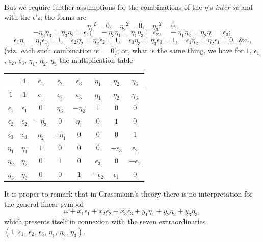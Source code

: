 \documentclass[11pt,a4paper]{book}
\begin{document}
But we require further assumptions for the combinations of the $\eta$'s
\textit{inter se} and with the $\epsilon$'s; the forms are
\[
\eta_1{}^2 = 0, \quad \eta_2{}^2 = 0, \quad \eta_3{}^2 = 0,
\]
\[
- \eta_2 \eta_3 = \eta_3 \eta_2 = \epsilon_1; \quad
- \eta_3 \eta_1 = \eta_1 \eta_3 = \epsilon_2, \quad
- \eta_1 \eta_2 = \eta_2 \eta_1 = \epsilon_3;
\]
\[
\epsilon_1 \eta_1 = \eta_1 \epsilon_1 = 1, \quad
\epsilon_2 \eta_2 = \eta_2 \epsilon_2 = 1, \quad
\epsilon_3 \eta_3 = \eta_3 \epsilon_3 = 1, \quad
\epsilon_1 \eta_2 = \eta_2 \epsilon_1 = 0, \text{ \&c.,}
\]
(viz.\ each such combination is $=0$); or, what is the same thing, we have for
$1$, $\epsilon_1$, $\epsilon_2$, $\epsilon_3$, $\eta_1$, $\eta_2$, $\eta_3$ the multiplication table

\begin{center}
\begin{tabular}{|c|c||c|c|c||c|c|c|}
\hline
  & $1$ & $\epsilon_1$ & $\epsilon_2$ & $\epsilon_3$ & $\eta_1$ & $\eta_2$ & $\eta_3$ \\
\hline
\hline
$1$ & $1$ & $\epsilon_1$ & $\epsilon_2$ & $\epsilon_3$ & $\eta_1$ & $\eta_2$ & $\eta_3$ \\
\hline
$\epsilon_1$ & $\epsilon_1$ & $0$ & $\eta_3$ & $-\eta_2$ & $1$ & $0$ & $0$ \\
$\epsilon_2$ & $\epsilon_2$ & $-\eta_3$ & $0$ & $\eta_1$ & $0$ & $1$ & $0$ \\
$\epsilon_3$ & $\epsilon_3$ & $\eta_2$ & $-\eta_1$ & $0$ & $0$ & $0$ & $1$ \\
\hline
$\eta_1$ & $\eta_1$ & $1$ & $0$ & $0$ & $0$ & $-\epsilon_3$ & $\epsilon_2$ \\
$\eta_2$ & $\eta_2$ & $0$ & $1$ & $0$ & $\epsilon_3$ & $0$ & $-\epsilon_1$ \\
$\eta_3$ & $\eta_3$ & $0$ & $0$ & $1$ & $-\epsilon_2$ & $\epsilon_1$ & $0$ \\
\hline
\end{tabular}
\end{center}

It is proper to remark that in Grassmann's theory there is no interpretation for
the general linear symbol
\[
\omega + x_1 \epsilon_1 + x_2 \epsilon_2 + x_3 \epsilon_3
+ y_1 \eta_1 + y_2 \eta_2 + y_3 \eta_3,
\]
which presents itself in connexion with the seven extraordinaries
$(1,\, \epsilon_1,\, \epsilon_2,\, \epsilon_3,\, \eta_1,\, \eta_2,\, \eta_3)$.
\end{document}
